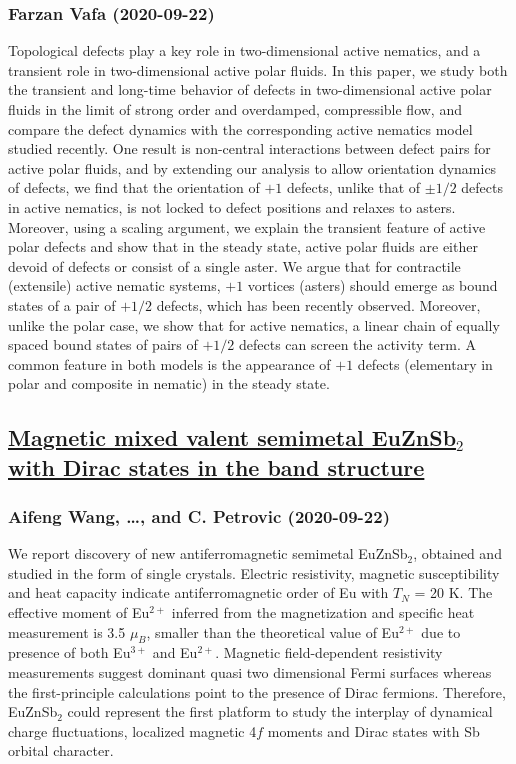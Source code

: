 {\subsubsection*{Farzan Vafa (2020-09-22)}
Topological defects play a key role in two-dimensional active nematics, and a
transient role in two-dimensional active polar fluids. In this paper, we study
both the transient and long-time behavior of defects in two-dimensional active
polar fluids in the limit of strong order and overdamped, compressible flow,
and compare the defect dynamics with the corresponding active nematics model
studied recently. One result is non-central interactions between defect pairs
for active polar fluids, and by extending our analysis to allow orientation
dynamics of defects, we find that the orientation of $+1$ defects, unlike that
of $\pm 1/2$ defects in active nematics, is not locked to defect positions and
relaxes to asters. Moreover, using a scaling argument, we explain the transient
feature of active polar defects and show that in the steady state, active polar
fluids are either devoid of defects or consist of a single aster. We argue that
for contractile (extensile) active nematic systems, $+1$ vortices (asters)
should emerge as bound states of a pair of $+1/2$ defects, which has been
recently observed. Moreover, unlike the polar case, we show that for active
nematics, a linear chain of equally spaced bound states of pairs of $+1/2$
defects can screen the activity term. A common feature in both models is the
appearance of $+1$ defects (elementary in polar and composite in nematic) in
the steady state.

\subsection*{\href{http://arxiv.org/abs/2009.10720v1}{Magnetic mixed valent semimetal EuZnSb$_2$ with Dirac states in the band  structure}}
\subsubsection*{Aifeng Wang, \dots, and C. Petrovic (2020-09-22)}
We report discovery of new antiferromagnetic semimetal EuZnSb$_2$, obtained
and studied in the form of single crystals. Electric resistivity, magnetic
susceptibility and heat capacity indicate antiferromagnetic order of Eu with
$T_N$ = 20 K. The effective moment of Eu$^{2+}$ inferred from the magnetization
and specific heat measurement is 3.5 $\mu_B$, smaller than the theoretical
value of Eu$^{2+}$ due to presence of both Eu$^{3+}$ and Eu$^{2+}$. Magnetic
field-dependent resistivity measurements suggest dominant quasi two dimensional
Fermi surfaces whereas the first-principle calculations point to the presence
of Dirac fermions. Therefore, EuZnSb$_2$ could represent the first platform to
study the interplay of dynamical charge fluctuations, localized magnetic 4$f$
moments and Dirac states with Sb orbital character.

}
